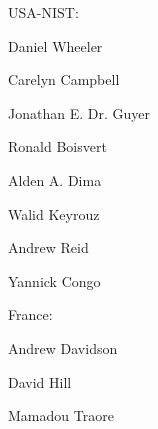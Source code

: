 USA-NIST: 

Daniel Wheeler

Carelyn Campbell

Jonathan E. Dr. Guyer

Ronald Boisvert

Alden A. Dima

Walid Keyrouz

Andrew Reid

Yannick Congo

France:

Andrew Davidson

David Hill

Mamadou Traore
